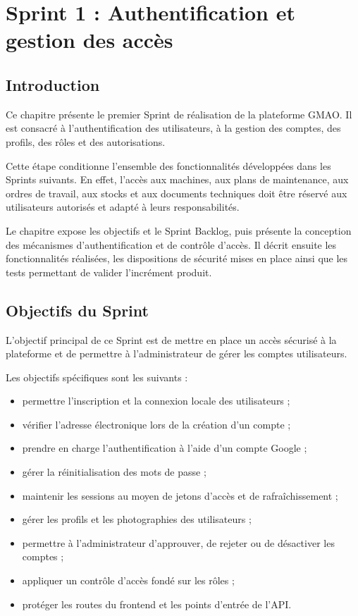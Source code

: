 \section{Sprint 1 : Authentification et gestion des accès}

\subsection{Introduction}

Ce chapitre présente le premier Sprint de réalisation de la plateforme GMAO. Il est consacré à l'authentification des utilisateurs, à la gestion des comptes, des profils, des rôles et des autorisations.

Cette étape conditionne l'ensemble des fonctionnalités développées dans les Sprints suivants. En effet, l'accès aux machines, aux plans de maintenance, aux ordres de travail, aux stocks et aux documents techniques doit être réservé aux utilisateurs autorisés et adapté à leurs responsabilités.

Le chapitre expose les objectifs et le Sprint Backlog, puis présente la conception des mécanismes d'authentification et de contrôle d'accès. Il décrit ensuite les fonctionnalités réalisées, les dispositions de sécurité mises en place ainsi que les tests permettant de valider l'incrément produit.

\subsection{Objectifs du Sprint}

L'objectif principal de ce Sprint est de mettre en place un accès sécurisé à la plateforme et de permettre à l'administrateur de gérer les comptes utilisateurs.

Les objectifs spécifiques sont les suivants :

\begin{itemize}
    \item permettre l'inscription et la connexion locale des utilisateurs ;
    \item vérifier l'adresse électronique lors de la création d'un compte ;
    \item prendre en charge l'authentification à l'aide d'un compte Google ;
    \item gérer la réinitialisation des mots de passe ;
    \item maintenir les sessions au moyen de jetons d'accès et de rafraîchissement ;
    \item gérer les profils et les photographies des utilisateurs ;
    \item permettre à l'administrateur d'approuver, de rejeter ou de désactiver les comptes ;
    \item appliquer un contrôle d'accès fondé sur les rôles ;
    \item protéger les routes du frontend et les points d'entrée de l'API.
\end{itemize}

